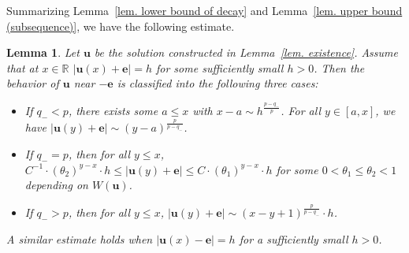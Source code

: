\documentclass[11pt,twoside,reqno]{amsart}
\newtheorem{lemma}{Lemma}[section]
\numberwithin{equation}{section}
\begin{document}
Summarizing Lemma~\ref{lem. lower bound of decay} and Lemma~\ref{lem. upper bound (subsequence)}, we have the following estimate.
\begin{lemma}\label{lem. (non-)existence of free boundary}
    Let $\mathbf{u}$ be the solution constructed in Lemma~\ref{lem. existence}. Assume that at $x\in\mathbb{R}$ $|\mathbf{u}(x)+\mathbf{e}|=h$ for some sufficiently small $h>0$. Then the behavior of $\mathbf{u}$ near $-\mathbf{e}$ is classified into the following three cases:
    \begin{itemize}
        \item[(1)] If $q_{-}<p$, there exists some $a\leq x$ with $x-a\sim h^{\frac{p-q_{-}}{p}}$. For all $y\in[a,x]$, we have $|\mathbf{u}(y)+\mathbf{e}|\sim(y-a)^{\frac{p}{p-q_{-}}}$.
        \item[(2)] If $q_{-}=p$, then for all $y\leq x$, $C^{-1}\cdot(\theta_{2})^{y-x}\cdot h\leq|\mathbf{u}(y)+\mathbf{e}|\leq C\cdot(\theta_{1})^{y-x}\cdot h$ for some $0<\theta_{1}\leq \theta_{2}<1$ depending on $W(\mathbf{u})$.
        \item[(3)] If $q_{-}>p$, then for all $y\leq x$, $|\mathbf{u}(y)+\mathbf{e}|\sim(x-y+1)^{\frac{p}{p-q_{-}}}\cdot h$.
    \end{itemize}
    A similar estimate holds when $|\mathbf{u}(x)-\mathbf{e}|=h$ for a sufficiently small $h>0$.
\end{lemma}
\end{document}

